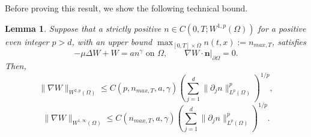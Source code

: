 \documentclass[12pt]{article}
\newcommand{\bd}{\boldsymbol}
\theoremstyle{plain}
\newtheorem{lemma}{Lemma}[section]
\begin{document}
\medskip

Before proving this result, we show the following technical bound.

\begin{lemma}\label{dissipativelemma}
Suppose that a strictly positive $n \in C(0, T; W^{1, p}(\Omega))$ for a positive even integer $p > d$, with an upper bound $\max_{[0, T] \times \overline{\Omega}} n(t, x) := n_{max, T}$, satisfies 
\begin{equation*}
-\mu \Delta W + W = an^{\gamma} \text{ on } \Omega, \qquad \nabla W \cdot \bd{n}|_{\partial \Omega} = 0.
\end{equation*}
Then,
\begin{equation}\label{gradp}
\|\nabla W\|_{W^{2, p}(\Omega)} \le C(p, n_{max, T}, a, \gamma) \left(\sum_{j = 1}^{d} \|\partial_{j}n\|^{p}_{L^{p}(\Omega)}\right)^{1/p},
\end{equation}
\begin{equation}\label{gradLip}
\|\nabla W\|_{W^{1, \infty}(\Omega)} \le C(n_{max, T}, a, \gamma) \left(\sum_{j = 1}^{d} \|\partial_{j} n\|_{L^{p}(\Omega)}^{p}\right)^{1/p}.
\end{equation}
\end{lemma}
\end{document}
